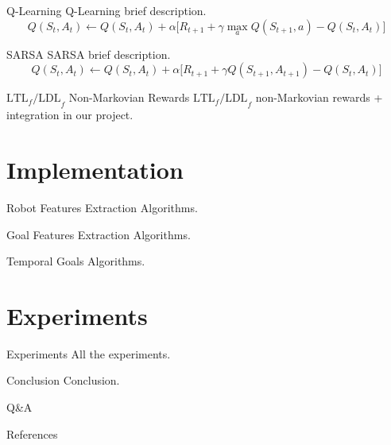 \documentclass[10pt]{beamer}
\begin{document}
    \begin{frame}{Q-Learning}
        Q-Learning brief description.
        \begin{equation*}
            Q(S_t, A_t) \leftarrow Q(S_t, A_t) + \alpha \Big[ R_{t+1} +
                \gamma \max_{a} Q(S_{t+1}, a) - Q(S_t, A_t) \Big]
        \end{equation*}
    \end{frame}

    \begin{frame}{SARSA}
        SARSA brief description.
        \begin{equation*}
            Q(S_t, A_t) \leftarrow Q(S_t, A_t) + \alpha \Big[ R_{t+1} +
                \gamma Q(S_{t+1}, A_{t+1}) - Q(S_t, A_t) \Big]
        \end{equation*}
    \end{frame}

    \begin{frame}{$\text{LTL}_f\text{/LDL}_f$ Non-Markovian Rewards}
        $\text{LTL}_f\text{/LDL}_f$ non-Markovian rewards + integration
        in our project.
    \end{frame}

    \section{Implementation}

    \begin{frame}{Robot Features Extraction}
        Algorithms.
    \end{frame}

    \begin{frame}{Goal Features Extraction}
        Algorithms.
    \end{frame}

    \begin{frame}{Temporal Goals}
        Algorithms.
    \end{frame}

    \section{Experiments}

    \begin{frame}{Experiments}
        All the experiments.
    \end{frame}

    \begin{frame}{Conclusion}
        Conclusion.
    \end{frame}

    \begin{frame}[standout]
        Q\&A
    \end{frame}

    \appendix

    \begin{frame}[allowframebreaks]{References}
        
        
    \end{frame}
\end{document}
